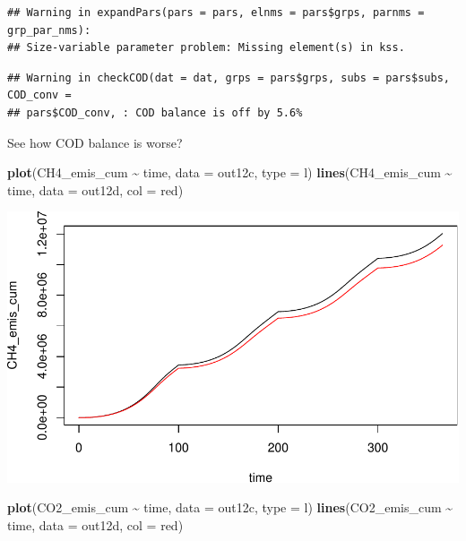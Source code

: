 \documentclass[
]{article}
\newenvironment{Shaded}{\begin{snugshade}}{\end{snugshade}}
\newcommand{\AttributeTok}[1]{\textcolor[rgb]{0.13,0.29,0.53}{#1}}
\newcommand{\FunctionTok}[1]{\textcolor[rgb]{0.13,0.29,0.53}{\textbf{#1}}}
\newcommand{\NormalTok}[1]{#1}
\newcommand{\SpecialCharTok}[1]{\textcolor[rgb]{0.81,0.36,0.00}{\textbf{#1}}}
\newcommand{\StringTok}[1]{\textcolor[rgb]{0.31,0.60,0.02}{#1}}
\begin{document}
\begin{verbatim}
## Warning in expandPars(pars = pars, elnms = pars$grps, parnms = grp_par_nms):
## Size-variable parameter problem: Missing element(s) in kss.
\end{verbatim}

\begin{verbatim}
## Warning in checkCOD(dat = dat, grps = pars$grps, subs = pars$subs, COD_conv =
## pars$COD_conv, : COD balance is off by 5.6%
\end{verbatim}

See how COD balance is worse?

\begin{Shaded}
\begin{Highlighting}[]
\FunctionTok{plot}\NormalTok{(CH4\_emis\_cum }\SpecialCharTok{\textasciitilde{}}\NormalTok{ time, }\AttributeTok{data =}\NormalTok{ out12c, }\AttributeTok{type =} \StringTok{\textquotesingle{}l\textquotesingle{}}\NormalTok{)}
\FunctionTok{lines}\NormalTok{(CH4\_emis\_cum }\SpecialCharTok{\textasciitilde{}}\NormalTok{ time, }\AttributeTok{data =}\NormalTok{ out12d, }\AttributeTok{col =} \StringTok{\textquotesingle{}red\textquotesingle{}}\NormalTok{)}
\end{Highlighting}
\end{Shaded}

\includegraphics{simple_demo_files/figure-latex/unnamed-chunk-100-1.pdf}

\begin{Shaded}
\begin{Highlighting}[]
\FunctionTok{plot}\NormalTok{(CO2\_emis\_cum }\SpecialCharTok{\textasciitilde{}}\NormalTok{ time, }\AttributeTok{data =}\NormalTok{ out12c, }\AttributeTok{type =} \StringTok{\textquotesingle{}l\textquotesingle{}}\NormalTok{)}
\FunctionTok{lines}\NormalTok{(CO2\_emis\_cum }\SpecialCharTok{\textasciitilde{}}\NormalTok{ time, }\AttributeTok{data =}\NormalTok{ out12d, }\AttributeTok{col =} \StringTok{\textquotesingle{}red\textquotesingle{}}\NormalTok{)}
\end{Highlighting}
\end{Shaded}
\end{document}
